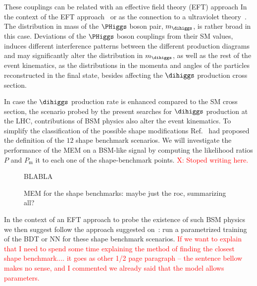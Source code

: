 These couplings can be related with an effective field theory (EFT) approach
In the context of the EFT approach~\cite{Buchalla:2015wfa, Goertz:2014qta} or as the connection to a ultraviolet theory~\cite{Carvalho:2017vnu,Belusca-Maito:2016dqe,deBlas:2014mba,Dawson:2017vgm}. %
The distribution in mass of the $\PHiggs$ boson pair, $m_{\dihiggs}$, is rather broad in this case.
Deviations of  the $\PHiggs$ boson couplings from their SM values, 
 induces different interference patterns between the different production diagrams and may  significantly alter the distribution in $m_{\dihiggs}$,
as well as the rest of the event kinematics,
as the distributions in the momenta and angles of the particles reconstructed in the final state,
besides affecting the $\dihiggs$ production cross section.


In case the $\dihiggs$ production rate is enhanced compared to the SM cross section, the scenario probed by the present searches for $\dihiggs$ production at the LHC,
 contributions of BSM physics also alter the event kinematics. To simplify the classification of the possible shape modifications Ref.~\cite{Carvalho:2015ttv} had proposed the definition of the $12$ shape benchmark scenarios. We will investigate the performance of the MEM on a BSM-like signal by computing the likelihood ratios $P$ and $P_{\textrm{m}}$ it to each one of the shape-benchmark points. \textcolor{red}{X: Stoped writing here.}  
 
 \begin{figure}
\setlength{\unitlength}{1mm}
\begin{center}
BLABLA
\end{center}
\caption{
  MEM for the shape benchmarks: maybe just the roc, summarizing all?
}
\label{fig:ttbar_FeynmanDiagram}
\end{figure}
 
 
In the context of an EFT approach to probe the existence of such BSM physics we then suggest follow the approach suggested on~\cite{Carvalho:2016rys}:  run a parametrized training of the BDT or NN for these shape benchmark scenarios. \textcolor{red}{If we want to explain that I need to spend some time explaining the method of finding the closest  shape benchmark.... it goes as other 1/2 page paragraph -- the sentence bellow makes no sense, and I commented we already said that the model allows parameters.} 


